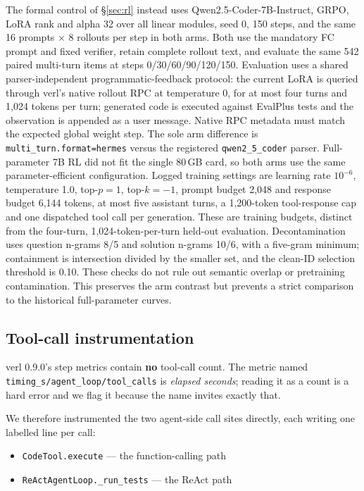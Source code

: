 The formal control of \S\ref{sec:rl} instead uses Qwen2.5-Coder-7B-Instruct, GRPO, LoRA rank and
alpha 32 over all linear modules, seed 0, 150 steps, and the same 16 prompts $\times$ 8 rollouts
per step in both arms. Both use the mandatory FC prompt and fixed verifier, retain complete rollout
text, and evaluate the same 542 paired multi-turn items at steps 0/30/60/90/120/150. Evaluation
uses a shared parser-independent programmatic-feedback protocol: the current LoRA is queried
through verl's native rollout RPC at temperature 0, for at most four turns and 1,024 tokens per
turn; generated code is executed against EvalPlus tests and the observation is appended as a user
message. Native RPC metadata must match the expected global weight step. The sole arm
difference is \texttt{multi\_turn.format=hermes} versus the registered
\texttt{qwen2\_5\_coder} parser. Full-parameter 7B RL did not fit the single 80\,GB card, so both
arms use the same parameter-efficient configuration. Logged training settings are learning rate
$10^{-6}$, temperature 1.0, top-$p=1$, top-$k=-1$, prompt budget 2,048 and response budget 6,144
tokens, at most five assistant turns, a 1,200-token tool-response cap and one dispatched tool
call per generation. These are
training budgets, distinct from the four-turn, 1,024-token-per-turn held-out evaluation.
Decontamination uses question n-grams 8/5 and solution n-grams 10/6, with a five-gram minimum;
containment is intersection divided by the smaller set, and the clean-ID selection threshold
is 0.10. These checks do not rule out semantic overlap or pretraining contamination.
This preserves the arm contrast but prevents
a strict comparison to the historical full-parameter curves.

\subsection{Tool-call instrumentation}

verl 0.9.0's step metrics contain \textbf{no} tool-call count. The metric named
\texttt{timing\_s/agent\_loop/tool\_calls} is \emph{elapsed seconds}; reading it as a count is
a hard error and we flag it because the name invites exactly that.

We therefore instrumented the two agent-side call sites directly, each writing one labelled
line per call:

\begin{itemize}
\tightlist
\item \texttt{CodeTool.execute} --- the function-calling path
\item \texttt{ReActAgentLoop.\_run\_tests} --- the ReAct path
\end{itemize}

